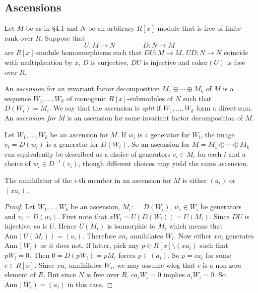 \documentclass[ALCO, Unicode]{cedram}
\newcommand{\Ann}{\mathrm{Ann}}
\begin{document}
\subsection{Ascensions}      \label{ascensec}    Let $ M $ be as in \S4.1  and $ N $ be an arbitrary $R[x]$-module that is free of finite rank over $ R  $. Suppose that    
$$ U : M \to N \quad \quad  \quad \quad D : N \to M  $$ 
are $ R[x]$-module homomorphisms such that $ DU : M \to M  $, $  UD : N \to N $ coincide with multiplication by $ x $, $ D $ is surjective, $ DU $ is injective and $ \mathrm{coker}(U) $ is free over $ R $.   

\begin{definition} An \emph{ascension} for an invariant factor decomposition $ M_{1} \oplus \cdots \oplus M_{k}  $ of $ M $ is a sequence $ W_{1} ,   \ldots,  W_{k} $ of monogenic $ R[x]$-submodules of $ N $ such that $ D(W_{i})  =  M_{i}  $.  We say that  the ascension is \emph{split} if   $ W_{1} , \ldots, W_{k} $ form a direct sum.  An \emph{ascension for $ M $}     is an ascension for some invariant factor decomposition of $ M $.    
\end{definition} 

Let $ W_{1}, \ldots, W_{k} $ be an ascension for $ M $. If $ w_{i} $ is a generator for $ W_{i} $, the image $ v_{i} = D(w_{i}) $ is a generator for $ 
D(W_{i}    )     $. So an ascension for $ M = M_{1} \oplus \cdots \oplus M_{k} $ can equivalently be described as a choice of generators $ v_{i} \in M_{i} $ for each $ i $ and a choice of $ w_{i} \in D^{-1} (v_{i}) $, though different choices may yield the same ascension. 


\begin{lemma}  \label{annascen}     The annihilator of the $i$-th member in an ascension for $ M $   is    either $ (a_{i})  $ or $ (x a_{i}) $. 
\end{lemma} 

\begin{proof}   Let $ W_{1}, \ldots , W_{k} $ be an ascension, $ M _{i} : = D(W_{i}) $,  $ w_{i} \in W_{i} $ be generators and $ v_{i} = D(w_{i}) $.     First note that  $ x W_{i} = U(D (W_{i})) = U(M_{i}) $. Since $ DU $ is injective, so is $ U$. Hence $ U(M_{i})  $ is isomorphic to $ M_{i} $ which means that $  \mathrm{Ann}(U(M_{i})) = (a_{i}) $. Therefore $ xa_{i} $ annihilates $ W_{i} $.  Now either $ x a_{i} $ generates $ \Ann(W_{i}) $ or it does not.     If latter, pick any  $ p \in R[x] \setminus (x a_{i} ) $ such that $ p W_{i} = 0 $.  Then $ 0  =  D(p W_{i}) = p M_{i}  $  forces  $ p \in (a_{i} ) $. So $ p = c a_{i} $ for some $ c \in R[x] $. Since $ x a_{i} $ annihilates $ W_{i} $,  we may assume wlog that $ c $ is a non-zero element of $ R $.  But since $  N $ is free over $ R $, $ ca_{i} W_{i} = 0 $ implies $ a_{i}W_{i} = 0 $. So $  \mathrm{Ann}(W_{i} ) = (a_{i}) $ in this  case. 
\end{proof} 
 
\end{document}
